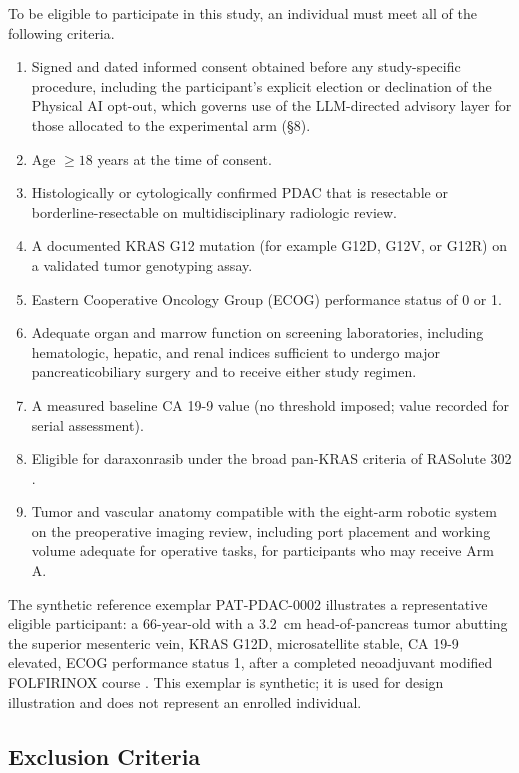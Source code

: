 To be eligible to participate in this study, an individual must meet all of the
following criteria.

\begin{enumerate}[leftmargin=1.6em,itemsep=2pt,topsep=2pt]
\item Signed and dated informed consent obtained before any study-specific
procedure, including the participant's explicit election or declination of the
Physical AI opt-out, which governs use of the LLM-directed advisory layer for those
allocated to the experimental arm (\S8).
\item Age $\geq 18$ years at the time of consent.
\item Histologically or cytologically confirmed PDAC that is resectable or
borderline-resectable on multidisciplinary radiologic review.
\item A documented KRAS G12 mutation (for example G12D, G12V, or G12R) on a
validated tumor genotyping assay.
\item Eastern Cooperative Oncology Group (ECOG) performance status of 0 or 1.
\item Adequate organ and marrow function on screening laboratories, including
hematologic, hepatic, and renal indices sufficient to undergo major
pancreaticobiliary surgery and to receive either study regimen.
\item A measured baseline CA 19-9 value (no threshold imposed; value recorded for
serial assessment).
\item Eligible for daraxonrasib under the broad pan-KRAS criteria of RASolute 302
\cite{rasolute302}.
\item Tumor and vascular anatomy compatible with the eight-arm robotic system on
the preoperative imaging review, including port placement and working volume
adequate for operative tasks, for participants who may receive Arm A.
\end{enumerate}

The synthetic reference exemplar PAT-PDAC-0002 illustrates a representative
eligible participant: a 66-year-old with a 3.2~cm head-of-pancreas tumor abutting
the superior mesenteric vein, KRAS G12D, microsatellite stable, CA 19-9 elevated,
ECOG performance status 1, after a completed neoadjuvant modified FOLFIRINOX course
\cite{Conroy2018}. This exemplar is synthetic; it is used for design illustration
and does not represent an enrolled individual.

\subsection{Exclusion Criteria}

